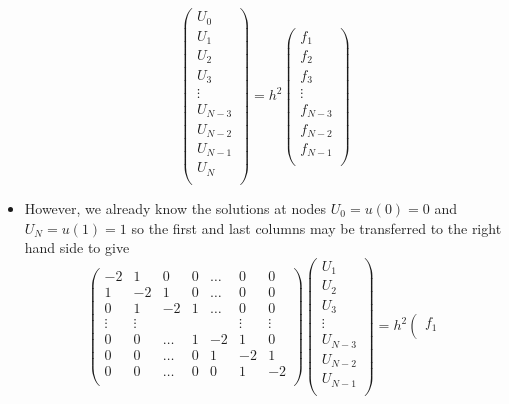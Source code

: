 \documentclass[12pt]{report}
\begin{document}
\begin{itemize}
\begin{displaymath}
 \left(\begin{matrix}
 U_0 \\
 U_1 \\
 U_2 \\
 U_3 \\
 \vdots \\
 U_{N-3} \\
 U_{N-2} \\
 U_{N-1} \\
 U_N \\
 \end{matrix}\right)
 = h^2\left(\begin{matrix}
  f_1 \\
  f_2 \\
  f_3 \\
  \vdots \\
  f_{N-3} \\
  f_{N-2} \\
  f_{N-1} \\
  \end{matrix}\right)
\end{displaymath}
\item However, we already know the solutions at nodes $U_0 = u(0) = 0$ and $U_N = u(1) = 1$ so the first and last columns may be transferred to the right hand side to give
\begin{displaymath}
\left(\begin{matrix}
-2 & 1 & 0 & 0 & \ldots & 0 & 0 \\
1 & -2 & 1 & 0 & \ldots & 0 & 0 \\
0 & 1 & -2 & 1 & \ldots & 0 & 0 \\
\vdots & \vdots &  &  &  & \vdots & \vdots \\
0 & 0 & \ldots & 1 & -2 & 1 & 0 \\
0 & 0 & \ldots & 0 & 1 & -2 & 1 \\
0 & 0 & \ldots & 0 & 0 & 1 & -2 \\
\end{matrix}\right)
\left(\begin{matrix}
U_1 \\
U_2 \\
U_3 \\
\vdots \\
U_{N-3} \\
U_{N-2} \\
U_{N-1} \\
\end{matrix}\right)
= h^2\left(\begin{matrix}
f_1 \\

\end{matrix}
\end{displaymath}
\end{itemize}
\end{document}
